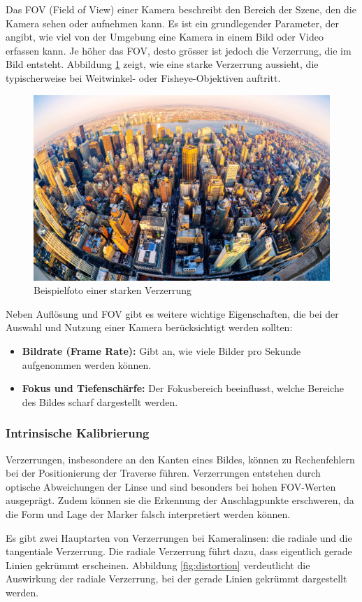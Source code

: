 Das FOV (Field of View) einer Kamera beschreibt den Bereich der Szene,
den die Kamera sehen oder aufnehmen kann. Es ist ein grundlegender 
Parameter, der angibt, wie viel von der Umgebung eine Kamera in einem 
Bild oder Video erfassen kann. Je höher das FOV, desto grösser ist 
jedoch die Verzerrung, die im Bild entsteht.
Abbildung \ref{fig:fisheye} zeigt, wie eine starke Verzerrung aussieht,
die typischerweise bei Weitwinkel- oder Fisheye-Objektiven auftritt.

\begin{figure}[H]
    \centering
    \includegraphics[width=0.5\linewidth]{graphics/fisheye.jpg}
    \caption{Beispielfoto einer starken Verzerrung}
    \label{fig:fisheye}
\end{figure}

Neben Auflösung und FOV gibt es weitere wichtige Eigenschaften, die 
bei der Auswahl und Nutzung einer Kamera berücksichtigt werden sollten:

\begin{itemize}
    \item \textbf{Bildrate (Frame Rate):} Gibt an, wie viele Bilder pro Sekunde aufgenommen werden können.
    \item \textbf{Fokus und Tiefenschärfe:} Der Fokusbereich beeinflusst, welche Bereiche des Bildes scharf dargestellt werden.
\end{itemize}


\subsubsection{Intrinsische Kalibrierung}
Verzerrungen, insbesondere an den Kanten eines Bildes, können zu Rechenfehlern 
bei der Positionierung der Traverse führen. Verzerrungen entstehen durch optische 
Abweichungen der Linse und sind besonders bei hohen FOV-Werten ausgeprägt. 
Zudem können sie die Erkennung der Anschlagpunkte erschweren, da die Form und 
Lage der Marker falsch interpretiert werden können.

Es gibt zwei Hauptarten von Verzerrungen bei Kameralinsen: die radiale und die tangentiale Verzerrung.
Die radiale Verzerrung führt dazu, dass eigentlich gerade Linien gekrümmt erscheinen. Abbildung 
\ref{fig:distortion} verdeutlicht die Auswirkung der radiale Verzerrung, bei der gerade Linien gekrümmt
dargestellt werden.

